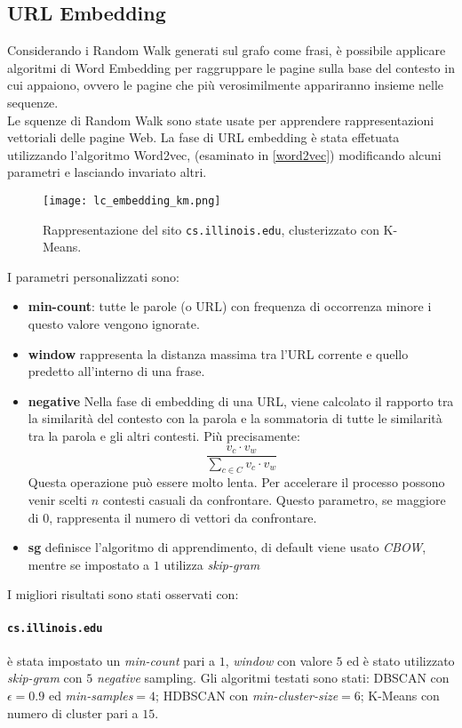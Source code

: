 \subsection{URL Embedding}
Considerando i Random Walk generati sul grafo come frasi, è possibile applicare algoritmi di Word Embedding per raggruppare le pagine sulla base del contesto in cui appaiono, ovvero le pagine che più verosimilmente appariranno insieme nelle sequenze.
\\
Le squenze di Random Walk sono state usate per apprendere rappresentazioni vettoriali delle pagine Web. La fase di URL embedding è stata effetuata utilizzando l'algoritmo Word2vec, \cite{gensim} (esaminato in \ref{word2vec}) modificando alcuni parametri e lasciando invariato altri.
\\
\begin{figure}[h!]
	\centering
	\texttt{[image: lc\_embedding\_km.png]}
	\caption{Rappresentazione del sito \texttt{cs.illinois.edu}, clusterizzato con K-Means.}
	\label{nc_embedding_km}
\end{figure}
I parametri personalizzati sono:
\begin{itemize}
\item \textbf{min-count}: tutte le parole (o URL) con frequenza di occorrenza minore i questo valore vengono ignorate.
\item \textbf{window} rappresenta la distanza massima tra l'URL corrente e quello predetto all'interno di una frase.
\item \textbf{negative} Nella fase di embedding di una URL, viene calcolato il rapporto tra la similarità del contesto con la parola e la sommatoria di tutte le similarità tra la parola e gli altri contesti. Più precisamente:
\begin{equation}
\frac{v_c \cdot v_w}{\sum\limits_{c \in C} v_c \cdot v_w}
\end{equation}
Questa operazione può essere molto lenta. Per accelerare il processo possono venir scelti $n$ contesti casuali da confrontare. Questo parametro, se maggiore di $0$, rappresenta il numero di vettori da confrontare.
\item \textbf{sg} definisce l'algoritmo di apprendimento, di default viene usato \textit{CBOW}, mentre se impostato a $1$ utilizza \textit{skip-gram} \cite{Mikolov13}
\end{itemize}
I migliori risultati sono stati osservati con:

\paragraph{\texttt{cs.illinois.edu}} è stata impostato un \textit{min-count} pari a $1$, \textit{window} con valore $5$ ed è stato utilizzato \textit{skip-gram} con $5$ \textit{negative} sampling. Gli algoritmi testati sono stati: DBSCAN con $\epsilon = 0.9$ ed \textit{min-samples}$ = 4$; HDBSCAN con \textit{min-cluster-size}$=6$; K-Means con numero di cluster pari a $15$. 

